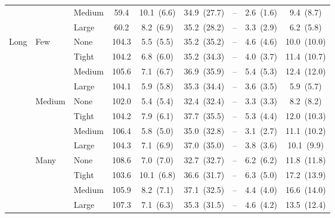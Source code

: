 \begin{table}[htbp]
{\begin{tabular}{lll c ccccc}
 &  & {\small Medium} & 59.4 & 10.1~{\scriptsize(6.6)} & 34.9~{\scriptsize(27.7)} & -- & 2.6~{\scriptsize(1.6)} & 9.4~{\scriptsize(8.7)} \\
 &  & {\small Large} & 60.2 & 8.2~{\scriptsize(6.9)} & 35.2~{\scriptsize(28.2)} & -- & 3.3~{\scriptsize(2.9)} & 6.2~{\scriptsize(5.8)} \\
\midrule
\multirow{12}{*}{\small Long} & \multirow{4}{*}{\small Few} & {\small None} & 104.3 & 5.5~{\scriptsize(5.5)} & 35.2~{\scriptsize(35.2)} & -- & 4.6~{\scriptsize(4.6)} & 10.0~{\scriptsize(10.0)} \\
 &  & {\small Tight} & 104.2 & 6.8~{\scriptsize(6.0)} & 35.2~{\scriptsize(34.3)} & -- & 4.0~{\scriptsize(3.7)} & 11.4~{\scriptsize(10.7)} \\
 &  & {\small Medium} & 105.6 & 7.1~{\scriptsize(6.7)} & 36.9~{\scriptsize(35.9)} & -- & 5.4~{\scriptsize(5.3)} & 12.4~{\scriptsize(12.0)} \\
 &  & {\small Large} & 104.1 & 5.9~{\scriptsize(5.8)} & 35.3~{\scriptsize(34.4)} & -- & 3.6~{\scriptsize(3.5)} & 5.9~{\scriptsize(5.7)} \\
 & \multirow{4}{*}{\small Medium} & {\small None} & 102.0 & 5.4~{\scriptsize(5.4)} & 32.4~{\scriptsize(32.4)} & -- & 3.3~{\scriptsize(3.3)} & 8.2~{\scriptsize(8.2)} \\
 &  & {\small Tight} & 104.2 & 7.9~{\scriptsize(6.1)} & 37.7~{\scriptsize(35.5)} & -- & 5.3~{\scriptsize(4.4)} & 12.0~{\scriptsize(10.3)} \\
 &  & {\small Medium} & 106.4 & 5.8~{\scriptsize(5.0)} & 35.0~{\scriptsize(32.8)} & -- & 3.1~{\scriptsize(2.7)} & 11.1~{\scriptsize(10.2)} \\
 &  & {\small Large} & 104.3 & 7.1~{\scriptsize(6.9)} & 37.0~{\scriptsize(35.0)} & -- & 3.8~{\scriptsize(3.6)} & 10.1~{\scriptsize(9.9)} \\
 & \multirow{4}{*}{\small Many} & {\small None} & 108.6 & 7.0~{\scriptsize(7.0)} & 32.7~{\scriptsize(32.7)} & -- & 6.2~{\scriptsize(6.2)} & 11.8~{\scriptsize(11.8)} \\
 &  & {\small Tight} & 103.6 & 10.1~{\scriptsize(6.8)} & 36.6~{\scriptsize(31.7)} & -- & 6.3~{\scriptsize(5.0)} & 17.2~{\scriptsize(13.9)} \\
 &  & {\small Medium} & 105.9 & 8.2~{\scriptsize(7.1)} & 37.1~{\scriptsize(32.5)} & -- & 4.4~{\scriptsize(4.0)} & 16.6~{\scriptsize(14.0)} \\
 &  & {\small Large} & 107.3 & 7.1~{\scriptsize(6.3)} & 35.3~{\scriptsize(31.5)} & -- & 4.6~{\scriptsize(4.2)} & 13.5~{\scriptsize(12.4)} \\
\bottomrule
\end{tabular}%
}
\end{table}
